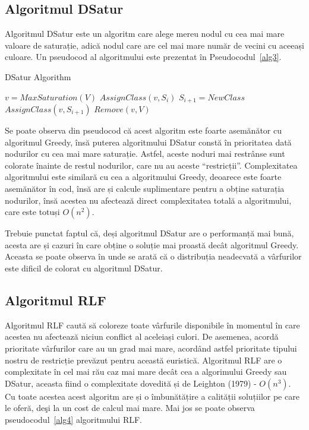 \documentclass[runningheads]{paper}
\begin{document}
\subsection{Algoritmul DSatur}
Algoritmul DSatur este un algoritm care alege mereu nodul cu cea mai mare
valoare de saturație, adică nodul care are cel mai mare număr de vecini cu
aceeași culoare. Un pseudocod al algoritmului este prezentat în Pseudocodul~\ref{alg3}.
\begin{algorithm}
\caption{DSatur Algorithm}
\label{alg3}
\begin{algorithmic}[1]
\State $v = MaxSaturation(V)$
\State $AssignClass(v, S_i)$
\EndIf
{}
\State $S_{i+1} = NewClass$
\State $AssignClass(v, S_{i+1})$
\State $Remove(v, V)$
\EndIf
\EndFor
\EndWhile
\EndProcedure
\end{algorithmic}
\end{algorithm}

Se poate observa din pseudocod că acest algoritm este foarte asemănător cu algoritmul
Greedy, însă puterea algoritmului DSatur constă în prioritatea dată nodurilor cu cea mai
mare saturație. Astfel, aceste noduri mai restrânse sunt colorate înainte de restul nodurilor,
care nu au aceste “restricții”. Complexitatea algoritmului este similară cu cea a algoritmului
Greedy, deoarece este foarte asemănător în cod, însă are și calcule suplimentare pentru a
obține saturația nodurilor, însă acestea nu afectează direct complexitatea totală a algoritmului,
care este totuși $O(n^2)$. 

Trebuie punctat faptul că, deși algoritmul DSatur are o performanță mai bună,
acesta are și cazuri în care obține o soluție
mai proastă decât algoritmul Greedy. Aceasta se poate observa în \cite{15} unde se arată că o
distribuția neadecvată a vârfurilor este dificil de colorat cu algoritmul DSatur.

\subsection{Algoritmul RLF}
Algoritmul RLF caută să coloreze toate vârfurile disponibile în momentul în care
acestea nu afectează niciun conflict al aceleiași culori. De asemenea, acordă
prioritate vârfurilor care au un grad mai mare, acordând astfel prioritate tipului
nostru de restricție prevăzut pentru această euristică. Algoritmul RLF are
o complexitate în cel mai rău caz mai mare decât cea a algorimului Greedy sau
DSatur, aceasta fiind o complexitate dovedită și de Leighton (1979) - $O(n^3)$.
Cu toate acestea acest algoritm are și o îmbunătățire a calității soluțiilor pe
care le oferă, deşi la un cost de calcul mai mare. Mai jos se poate observa pseudocodul~\ref{alg4} algoritmului RLF.
\end{document}
